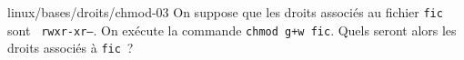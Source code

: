\begin{question}{linux/bases/droits/chmod-03}
  On suppose que les droits associés au fichier {\tt fic} sont {\tt
    rwxr-xr--}. On exécute la commande {\tt chmod g+w fic}. Quels
  seront alors les droits associés à {\tt fic}~?
  \begin{reponses}
    \lastchoices
  \end{reponses}
\end{question}

